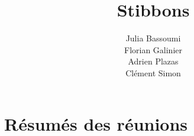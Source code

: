 \documentclass[a4paper,11pt]{report}
\title{Stibbons}
\author{Julia Bassoumi\\Florian Galinier\\Adrien Plazas\\Clément Simon}
\begin{document}
\maketitle
\tableofcontents

\begin{abstract}
\end{abstract}

\appendix

\chapter{Résumés des réunions}



\end{document}
